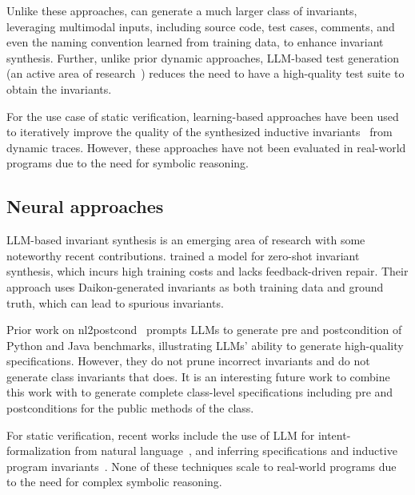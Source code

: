 Unlike these approaches, \tech can generate a much larger class of invariants, leveraging multimodal inputs, including source code, test cases, comments, and even the naming convention learned from training data, to enhance invariant synthesis.
Further, unlike prior dynamic approaches, LLM-based test generation (an active area of research~\cite{codamosa-icse23,schäfer2023empiricalevaluationusinglarge,yang2024whitefox}) reduces the need to have a high-quality test suite to obtain the invariants.

For the use case of static verification, learning-based approaches have been used to iteratively improve the quality of the synthesized inductive invariants~\cite{garg2014learning, garg2016learning, padhi2016loopinvgen} from dynamic traces. 
However, these approaches have not been evaluated in real-world programs due to the need for symbolic reasoning. 

\subsection{Neural approaches}
LLM-based invariant synthesis is an emerging area of research with some noteworthy recent contributions. \citet{pei2023learning} trained a model for zero-shot invariant synthesis, which incurs high training costs and lacks feedback-driven repair. 
Their approach uses Daikon-generated invariants as both training data and ground truth, which can lead to spurious invariants. 

Prior work on nl2postcond~\cite{nl2postcond} prompts LLMs to generate pre and postcondition of Python and Java benchmarks, illustrating LLMs' ability to generate high-quality specifications. 
However, they do not prune incorrect invariants and do not generate class invariants that \tech does. 
It is an interesting future work to combine this work with \tech to generate complete class-level specifications including pre and postconditions for the public methods of the class.

For static verification, recent works include the use of LLM for intent-formalization from natural language~\cite{lahiri2024evaluating},  and inferring specifications and inductive program invariants~\cite{loopy,ma2024specgen}.
None of these techniques scale to real-world programs due to the need for complex symbolic reasoning. 

